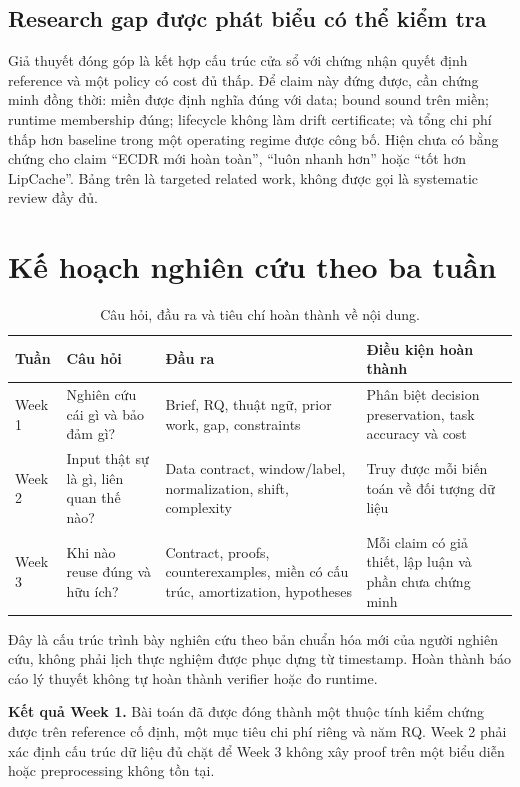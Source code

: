 \documentclass[11pt,a4paper]{article}
\theoremstyle{remark}
\begin{document}
\subsection{Research gap được phát biểu có thể kiểm tra}
Giả thuyết đóng góp là kết hợp cấu trúc cửa sổ với chứng nhận quyết định
reference và một policy có cost đủ thấp. Để claim này đứng được, cần chứng
minh đồng thời: miền được định nghĩa đúng với data; bound sound trên miền;
runtime membership đúng; lifecycle không làm drift certificate; và tổng
chi phí thấp hơn baseline trong một operating regime được công bố.
Hiện chưa có bằng chứng cho claim ``ECDR mới hoàn toàn'', ``luôn nhanh hơn''
hoặc ``tốt hơn LipCache''. Bảng trên là targeted related work, không được
gọi là systematic review đầy đủ.

\section{Kế hoạch nghiên cứu theo ba tuần}
\begin{table}[!htbp]\centering
\caption{Câu hỏi, đầu ra và tiêu chí hoàn thành về nội dung.}
\begin{tabularx}{\linewidth}{@{}p{1.35cm}YYY@{}}\toprule
Tuần & Câu hỏi & Đầu ra & Điều kiện hoàn thành\\\midrule
Week 1 & Nghiên cứu cái gì và bảo đảm gì? & Brief, RQ, thuật ngữ, prior work,
gap, constraints & Phân biệt decision preservation, task accuracy và cost\\
Week 2 & Input thật sự là gì, liên quan thế nào? & Data contract, window/label,
normalization, shift, complexity & Truy được mỗi biến toán về đối tượng dữ liệu\\
Week 3 & Khi nào reuse đúng và hữu ích? & Contract, proofs, counterexamples,
miền có cấu trúc, amortization, hypotheses & Mỗi claim có giả thiết, lập luận
và phần chưa chứng minh\\\bottomrule
\end{tabularx}
\end{table}
Đây là cấu trúc trình bày nghiên cứu theo bản chuẩn hóa mới của người nghiên
cứu, không phải lịch thực nghiệm được phục dựng từ timestamp. Hoàn thành
báo cáo lý thuyết không tự hoàn thành verifier hoặc đo runtime.

\textbf{Kết quả Week 1.} Bài toán đã được đóng thành một thuộc tính kiểm
chứng được trên reference cố định, một mục tiêu chi phí riêng và năm RQ.
Week 2 phải xác định cấu trúc dữ liệu đủ chặt để Week 3 không xây proof trên
một biểu diễn hoặc preprocessing không tồn tại.
\end{document}
